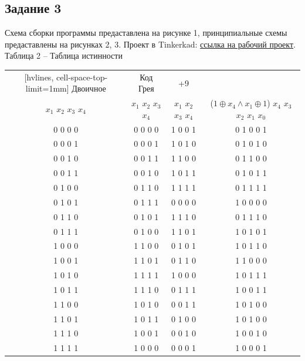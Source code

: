 \documentclass[a4paper,14pt]{extarticle}
\begin{document}
  \subsection*{\hspace{12.5mm}Задание 3}
  Схема сборки программы предаставлена на рисунке 1, принципиальные схемы предаставлены на рисунках 2, 3. Проект в Tinkerkad: \href{https://www.tinkercad.com/things/e4K54R4CD0k-lr-5-3-deshifrator/editel?returnTo=%2Fdashboard%2Fdesigns%2Fcircuits&sharecode=-Hv8qgPniVeXdUa-nYDvK8NiAmY0oiQlfKNoSDOx3QA}{ссылка на рабочий проект}. \\

  \noindent Таблица 2 -- Таблица истинности\\
  \begin{NiceTabular}{cccc}[hvlines, cell-space-top-limit=1mm]
    Двоичное & Код Грея & +9 & \\
    $x_1$ $x_2$ $x_3$ $x_4$ & $x_1$ $x_2$ $x_3$ $x_4$ & $x_1$ $x_2$ $x_3$ $x_4$ & ($1 \oplus x_4 \land x_1 \oplus 1$) $x_4$ $x_3$ $x_2$ $x_1$ $x_0$  \\

    0 0 0 0 & 0 0 0 0 & 1 0 0 1 & 0 1 0 0 1 \\
    0 0 0 1 & 0 0 0 1 & 1 0 1 0 & 0 1 0 1 0 \\
    0 0 1 0 & 0 0 1 1 & 1 1 0 0 & 0 1 1 0 0 \\
    0 0 1 1 & 0 0 1 0 & 1 0 1 1 & 0 1 0 1 1 \\
    0 1 0 0 & 0 1 1 0 & 1 1 1 1 & 0 1 1 1 1 \\
    0 1 0 1 & 0 1 1 1 & 0 0 0 0 & 1 0 0 0 0 \\
    0 1 1 0 & 0 1 0 1 & 1 1 1 0 & 0 1 1 1 0 \\
    0 1 1 1 & 0 1 0 0 & 1 1 0 1 & 1 0 1 0 1 \\
    1 0 0 0 & 1 1 0 0 & 0 1 0 1 & 1 0 1 1 0 \\
    1 0 0 1 & 1 1 0 1 & 0 1 1 0 & 1 1 0 0 0 \\
    1 0 1 0 & 1 1 1 1 & 1 0 0 0 & 1 0 1 1 1 \\
    1 0 1 1 & 1 1 1 0 & 0 1 1 1 & 1 0 0 1 1 \\
    1 1 0 0 & 1 0 1 0 & 0 0 1 1 & 1 0 1 0 0 \\
    1 1 0 1 & 1 0 1 1 & 0 1 0 0 & 1 0 1 0 0 \\
    1 1 1 0 & 1 0 0 1 & 0 0 1 0 & 1 0 0 1 0 \\
    1 1 1 1 & 1 0 0 0 & 0 0 0 1 & 1 0 0 0 1 \\
  \end{NiceTabular}\\
\end{document}

